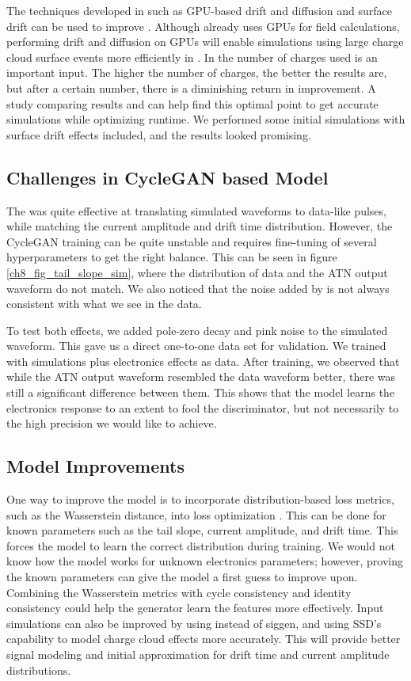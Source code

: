 The techniques developed in {\ehd} such as GPU-based drift and diffusion and surface drift can be used to improve {\ssd}. Although {\ssd} already uses GPUs for field calculations, performing drift and diffusion on GPUs will enable simulations using large charge cloud surface events more efficiently in {\ssd}. In {\ssd} the number of charges used is an important input. The higher the number of charges, the better the results are, but after a certain number, there is a diminishing return in improvement. A study comparing {\ehd} results and {\ssd} can help find this optimal point to get accurate simulations while optimizing runtime. We performed some initial {\ssd} simulations with surface drift effects included, and the results looked promising.

\subsection{Challenges in CycleGAN based Model}
The {\cpunet} was quite effective at translating simulated waveforms to data-like pulses, while matching the current amplitude and drift time distribution. However, the CycleGAN training can be quite unstable and requires fine-tuning of several hyperparameters to get the right balance. This can be seen in figure \ref{ch8_fig_tail_slope_sim}, where the distribution of data and the ATN output waveform do not match. We also noticed that the noise added by {\cpunet} is not always consistent with what we see in the data. 

To test both effects, we added pole-zero decay and pink noise to the simulated waveform. This gave us a direct one-to-one data set for validation. We trained {\cpunet} with simulations plus electronics effects as data. After training, we observed that while the ATN output waveform resembled the data waveform better, there was still a significant difference between them. This shows that the model learns the electronics response to an extent to fool the discriminator, but not necessarily to the high precision we would like to achieve.

\subsection{{\cpunet} Model Improvements}
One way to improve the model is to incorporate distribution-based loss metrics, such as the Wasserstein distance, into loss optimization \cite{vaserstein1969markov}. This can be done for known parameters such as the tail slope, current amplitude, and drift time. This forces the model to learn the correct distribution during training. We would not know how the model works for unknown electronics parameters; however, proving the known parameters can give the model a first guess to improve upon. Combining the Wasserstein metrics with cycle consistency and identity consistency could help the generator learn the features more effectively. Input simulations can also be improved by using {\ssd} instead of siggen, and using SSD's capability to model charge cloud effects more accurately. This will provide better signal modeling and initial approximation for drift time and current amplitude distributions.

